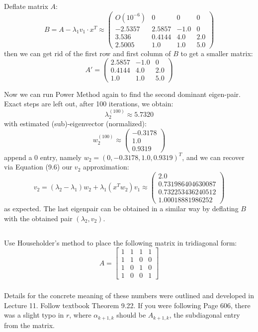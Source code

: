 \documentclass[12pt]{article} %
\newcommand{\1}[1]{\mathds{1}\left[#1\right]}
\begin{document}
Deflate matrix $A$:
$$
	B = A - \lambda_1 v_1\cdot x^T \approx
	\begin{pmatrix}
		O(10^{-6}) &  0&  0   &   0\\   
		-2.5357&  2.5857&  -1.0&   0\\
		3.536& 0.4144&  4.0 &  2.0\\
		2.5005& 1.0& 1.0 &  5.0   
	\end{pmatrix}
$$ then we can get rid of the first row and first column of $B$ to get a smaller matrix:
$$
	A' = 
	\begin{pmatrix}
	2.5857&  -1.0&   0\\
	0.4144&  4.0 &  2.0\\
	1.0& 1.0 &  5.0   
	\end{pmatrix}
$$

Now we can run Power Method again to find the second dominant eigen-pair. Exact steps are left out, after 100 iterations, we obtain:
$$
	\lambda_2^{(100)}\approx 5.7320
$$ with estimated (sub)-eigenvector (normalized):
$$
	w_2^{(100)}\approx\begin{pmatrix}
		-0.3178\\1.0\\0.9319
	\end{pmatrix}
$$ append a 0 entry, namely $w_2 = (0, -0.3178, 1.0, 0.9319)^T$, and we can recover via Equation (9.6) our $v_2$ approximation:
$$
	v_2  = (\lambda_2 - \lambda_1)w_2 + \lambda_1(x^Tw_2)v_1 \approx 
	\begin{pmatrix}
	2.0 \\
	0.731986404630087\\
	0.732253436240512\\
	1.00018881986252
	\end{pmatrix}
$$ as expected. The last eigenpair can be obtained in a similar way by deflating $B$ with the obtained pair $(\lambda_2, v_2)$.


\newpage
\subsection{}
Use Householder's method to place the following matrix in tridiagonal form:
$$
	A = 
	\begin{bmatrix}
		1 & 1 & 1 & 1 \\
		1 & 1 & 0 & 0 \\
		1 & 0 & 1 & 0 \\
		1 & 0 & 0 & 1
	\end{bmatrix}
$$
\subsubsection{}
Details for the concrete meaning of these numbers were outlined and developed in Lecture 11. Follow textbook Theorem 9.22. If you were following Page 606, there was a slight typo in $r$, where $\alpha_{k+1,k}$ should be $A_{k+1,k}$, the subdiagonal entry from the matrix.
\end{document}
